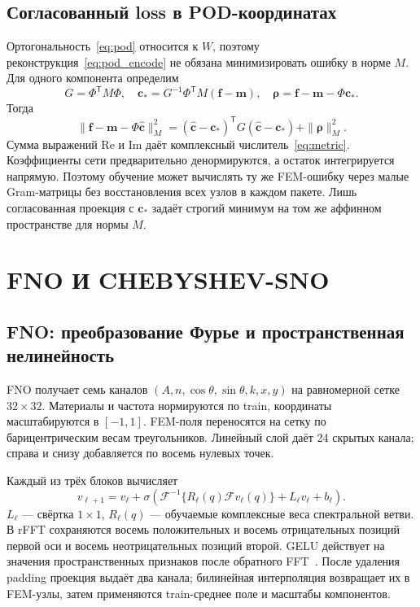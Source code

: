 \documentclass[notitle]{sibjima_preview}
\newcommand{\trans}{\mathsf{T}}
\begin{document}
\subsection{Согласованный loss в POD-координатах}
Ортогональность~\eqref{eq:pod} относится к \(W\), поэтому реконструкция~\eqref{eq:pod_encode} не обязана минимизировать ошибку в норме \(M\). Для одного компонента определим
\begin{equation}
G=\Phi^\trans M\Phi,\quad
\bm c_*=G^{-1}\Phi^\trans M(\bm f-\bm m),\quad
\bm\rho=\bm f-\bm m-\Phi\bm c_*.
\label{eq:consistent_projection}
\end{equation}
Тогда
\begin{equation}
\|\bm f-\bm m-\Phi\widehat{\bm c}\|_M^2
=(\widehat{\bm c}-\bm c_*)^\trans G(\widehat{\bm c}-\bm c_*)+\|\bm\rho\|_M^2.
\label{eq:quadratic}
\end{equation}
Сумма выражений Re и Im даёт комплексный числитель~\eqref{eq:metric}. Коэффициенты сети предварительно денормируются, а остаток интегрируется напрямую. Поэтому обучение может вычислять ту же FEM-ошибку через малые Gram-матрицы без восстановления всех узлов в каждом пакете. Лишь согласованная проекция с \(\bm c_*\) задаёт строгий минимум на том же аффинном пространстве для нормы \(M\).

\section{FNO И CHEBYSHEV-SNO}
\subsection{FNO: преобразование Фурье и пространственная нелинейность}
FNO получает семь каналов \((A,n,\cos\theta,\sin\theta,k,x,y)\) на равномерной сетке \(32\times32\). Материалы и частота нормируются по train, координаты масштабируются в \([-1,1]\). FEM-поля переносятся на сетку по барицентрическим весам треугольников. Линейный слой даёт 24 скрытых канала; справа и снизу добавляется по восемь нулевых точек.

Каждый из трёх блоков вычисляет
\begin{equation}
v_{\ell+1}=v_\ell+\sigma\!\left(
\mathcal F^{-1}\{R_\ell(q)\mathcal Fv_\ell(q)\}+L_\ell v_\ell+b_\ell\right).
\label{eq:fno}
\end{equation}
\(L_\ell\) --- свёртка \(1\times1\), \(R_\ell(q)\) --- обучаемые комплексные веса спектральной ветви. В rFFT сохраняются восемь положительных и восемь отрицательных позиций первой оси и восемь неотрицательных позиций второй. GELU действует на значения пространственных признаков после обратного FFT~\cite{li2020}. После удаления padding проекция выдаёт два канала; билинейная интерполяция возвращает их в FEM-узлы, затем применяются train-среднее поле и масштабы компонентов.
\end{document}
